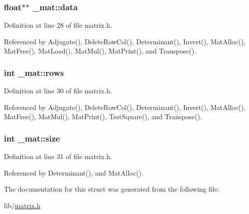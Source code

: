 \subsubsection[{\texorpdfstring{data}{data}}]{\setlength{\rightskip}{0pt plus 5cm}float$\ast$$\ast$ \+\_\+mat\+::data}\hypertarget{struct__mat_a00dcd82a8de11b7f16f7edfde55bcfae}{}\label{struct__mat_a00dcd82a8de11b7f16f7edfde55bcfae}


Definition at line 28 of file matrix.\+h.



Referenced by Adjugate(), Delete\+Row\+Col(), Determinant(), Invert(), Mat\+Alloc(), Mat\+Free(), Mat\+Load(), Mat\+Mul(), Mat\+Print(), and Transpose().

\subsubsection[{\texorpdfstring{rows}{rows}}]{\setlength{\rightskip}{0pt plus 5cm}int \+\_\+mat\+::rows}\hypertarget{struct__mat_a5e6bcb8b0c0239ca9b782c48b0b3c98a}{}\label{struct__mat_a5e6bcb8b0c0239ca9b782c48b0b3c98a}


Definition at line 30 of file matrix.\+h.



Referenced by Adjugate(), Delete\+Row\+Col(), Determinant(), Invert(), Mat\+Alloc(), Mat\+Free(), Mat\+Mul(), Mat\+Print(), Test\+Square(), and Transpose().

\subsubsection[{\texorpdfstring{size}{size}}]{\setlength{\rightskip}{0pt plus 5cm}int \+\_\+mat\+::size}\hypertarget{struct__mat_ab54203ad7b60fc23832cb3b2a863857f}{}\label{struct__mat_ab54203ad7b60fc23832cb3b2a863857f}


Definition at line 31 of file matrix.\+h.



Referenced by Determinant(), and Mat\+Alloc().



The documentation for this struct was generated from the following file\+:\begin{DoxyCompactItemize}
\item 
lib/\hyperlink{matrix_8h}{matrix.\+h}\end{DoxyCompactItemize}
